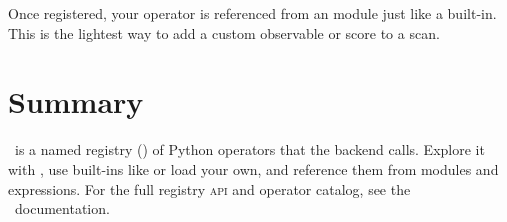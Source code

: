 \noindent Once registered, your operator is referenced from an  module just like a
built-in. This is the lightest way to add a custom observable or score to a scan.

\section{Summary}
\label{sec:op-jarvis-summary}

\Operas\ is a named registry () of Python operators that the 
backend calls. Explore it with , use built-ins like  or load your
own, and reference them from  modules and expressions. For the full registry
\textsc{api} and operator catalog, see the \Operas\ documentation.
